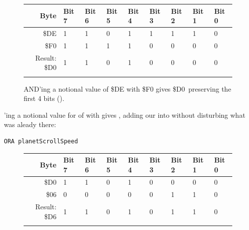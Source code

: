\begin{figure}[H]
  {
    \setlength{\tabcolsep}{3.0pt}
    \setlength\cmidrulewidth{\heavyrulewidth} %
    \begin{adjustbox}{width=6cm,center}

      \begin{tabular}{rllllllll}
        \toprule
        Byte & Bit 7 & Bit 6 & Bit 5 & Bit 4 & Bit 3 & Bit 2 & Bit 1 & Bit 0        \\
        \midrule
        \$DE & 1 & 1 & 0 & 1 & 1 & 1 & 1 & 0 \\
        \$F0 & 1 & 1 & 1 & 1 & 0 & 0 & 0 & 0 \\
        \midrule
        Result: \$D0 & 1 & 1 & 0 & 1 & 0 & 0 & 0 & 0 \\
        \addlinespace
        \bottomrule
      \end{tabular}

    \end{adjustbox}

  }\caption*{AND'ing a notional value of \$DE with \$F0 gives \$D0\, preserving the first 4 bits ().}
\end{figure}

'ing a notional value for  of  with  gives , 
adding our  into  without disturbing what was aleady there:

\begin{lstlisting}[]
        ORA planetScrollSpeed
\end{lstlisting}

\begin{figure}[H]
  {
    \setlength{\tabcolsep}{3.0pt}
    \setlength\cmidrulewidth{\heavyrulewidth} %
    \begin{adjustbox}{width=6cm,center}

      \begin{tabular}{rllllllll}
        \toprule
        Byte & Bit 7 & Bit 6 & Bit 5 & Bit 4 & Bit 3 & Bit 2 & Bit 1 & Bit 0        \\
        \midrule
        \$D0 & 1 & 1 & 0 & 1 & 0 & 0 & 0 & 0 \\
        \$06 & 0 & 0 & 0 & 0 & 0 & 1 & 1 & 0 \\
        \midrule
        Result: \$D6 & 1 & 1 & 0 & 1 & 0 & 1 & 1 & 0 \\
        \addlinespace
        \bottomrule
      \end{tabular}
    \end{adjustbox}
  }
\end{figure}

